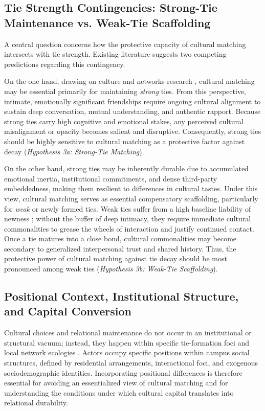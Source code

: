 \documentclass[12pt,letterpaper]{article}
\begin{document}
\subsection{Tie Strength Contingencies: Strong-Tie Maintenance vs. Weak-Tie Scaffolding}\label{tie-strength-contingencies}

A central question concerns how the protective capacity of cultural matching intersects with tie strength. Existing literature suggests two competing predictions regarding this contingency.

On the one hand, drawing on culture and networks research \citep{vaisey2010, edelmann2014cultural-a77}, cultural matching may be essential primarily for maintaining \textit{strong} ties. From this perspective, intimate, emotionally significant friendships require ongoing cultural alignment to sustain deep conversation, mutual understanding, and authentic rapport. Because strong ties carry high cognitive and emotional stakes, any perceived cultural misalignment or opacity becomes salient and disruptive. Consequently, strong ties should be highly sensitive to cultural matching as a protective factor against decay (\textit{Hypothesis 3a: Strong-Tie Matching}).

On the other hand, strong ties may be inherently durable due to accumulated emotional inertia, institutional commitments, and dense third-party embeddedness, making them resilient to differences in cultural tastes. Under this view, cultural matching serves as essential compensatory scaffolding, particularly for \textit{weak} or newly formed ties. Weak ties suffer from a high baseline liability of newness \citep{burt2000}; without the buffer of deep intimacy, they require immediate cultural commonalities to grease the wheels of interaction and justify continued contact. Once a tie matures into a close bond, cultural commonalities may become secondary to generalized interpersonal trust and shared history. Thus, the protective power of cultural matching against tie decay should be most pronounced among weak ties (\textit{Hypothesis 3b: Weak-Tie Scaffolding}).

\subsection{Positional Context, Institutional Structure, and Capital Conversion}\label{positional-context}

Cultural choices and relational maintenance do not occur in an institutional or structural vacuum; instead, they happen within specific tie-formation foci and local network ecologies \citep{feld1982social-f52, mcfarland2014network-735}. Actors occupy specific positions within campus social structures, defined by residential arrangements, interactional foci, and exogenous sociodemographic identities. Incorporating positional differences is therefore essential for avoiding an essentialized view of cultural matching and for understanding the conditions under which cultural capital translates into relational durability.
\end{document}

